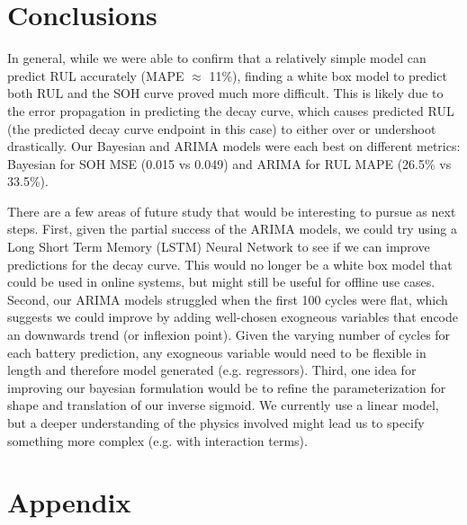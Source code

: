 \documentclass{article}
\begin{document}
\section{Conclusions}
In general, while we were able to confirm that a relatively simple model can predict RUL accurately (MAPE $\approx$ 11\%), finding a white box model to predict both RUL and the SOH curve proved much more difficult. This is likely due to the error propagation in predicting the decay curve, which causes predicted RUL (the predicted decay curve endpoint in this case) to either over or undershoot drastically. Our Bayesian and ARIMA models were each best on different metrics: Bayesian for SOH MSE (0.015 vs 0.049) and ARIMA for RUL MAPE (26.5\% vs 33.5\%).  

There are a few areas of future study that would be interesting to pursue as next steps. First, given the partial success of the ARIMA models, we could try using a Long Short Term Memory (LSTM) Neural Network to see if we can improve predictions for the decay curve. This would no longer be a white box model that could be used in online systems, but might still be useful for offline use cases. Second, our ARIMA models struggled when the first 100 cycles were flat, which suggests we could improve by adding well-chosen exogneous variables that encode an downwards trend (or inflexion point). Given the varying number of cycles for each battery prediction, any exogneous variable would need to be flexible in length and therefore model generated (e.g. regressors). Third, one idea for improving our bayesian formulation would be to refine the parameterization for shape and translation of our inverse sigmoid. We currently use a linear model, but a deeper understanding of the physics involved might lead us to specify something more complex (e.g. with interaction terms).


\newpage
\section{Appendix}
\end{document}
